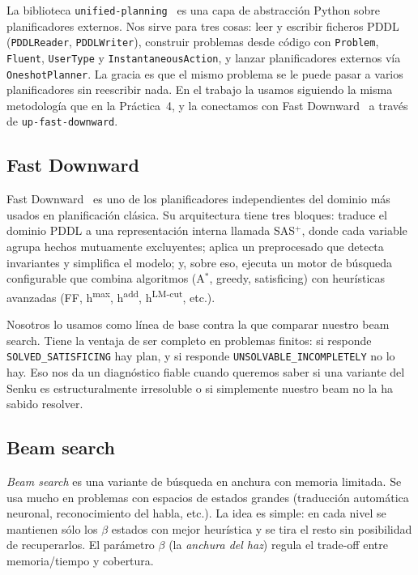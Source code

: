 \documentclass[conference,a4paper]{IEEEtran}
\begin{document}
La biblioteca \texttt{unified-planning}~\cite{up} es una capa de
abstracción Python sobre planificadores externos. Nos sirve para tres
cosas: leer y escribir ficheros PDDL (\texttt{PDDLReader},
\texttt{PDDLWriter}), construir problemas desde código con
\texttt{Problem}, \texttt{Fluent}, \texttt{UserType} y
\texttt{InstantaneousAction}, y lanzar planificadores externos vía
\texttt{OneshotPlanner}. La gracia es que el mismo problema se le puede
pasar a varios planificadores sin reescribir nada. En el trabajo la
usamos siguiendo la misma metodología que en la Práctica~4, y la conectamos
con Fast Downward~\cite{fastdownward} a través de \texttt{up-fast-downward}.


\subsection{Fast Downward}

Fast Downward~\cite{fastdownward} es uno de los planificadores
independientes del dominio más usados en planificación clásica. Su
arquitectura tiene tres bloques: traduce el dominio PDDL a una
representación interna llamada SAS$^+$, donde cada variable agrupa hechos
mutuamente excluyentes; aplica un preprocesado que detecta invariantes y
simplifica el modelo; y, sobre eso, ejecuta un motor de búsqueda
configurable que combina algoritmos (A$^*$, greedy, satisficing) con
heurísticas avanzadas (FF, h\textsuperscript{max}, h\textsuperscript{add},
h\textsuperscript{LM-cut}, etc.).

Nosotros lo usamos como línea de base contra la que comparar nuestro beam
search. Tiene la ventaja de ser completo en problemas finitos: si responde
\texttt{SOLVED\_SATISFICING} hay plan, y si responde
\texttt{UNSOLVABLE\_INCOMPLETELY} no lo hay. Eso nos da un diagnóstico
fiable cuando queremos saber si una variante del Senku es estructuralmente
irresoluble o si simplemente nuestro beam no la ha sabido resolver.


\subsection{Beam search}

\emph{Beam search} es una variante de búsqueda en anchura con memoria
limitada. Se usa mucho en problemas con espacios de estados grandes
(traducción automática neuronal, reconocimiento del habla, etc.). La
idea es simple: en cada nivel se mantienen sólo los $\beta$ estados con
mejor heurística y se tira el resto sin posibilidad de recuperarlos. El
parámetro $\beta$ (la \emph{anchura del haz}) regula el trade-off entre
memoria/tiempo y cobertura.
\end{document}

